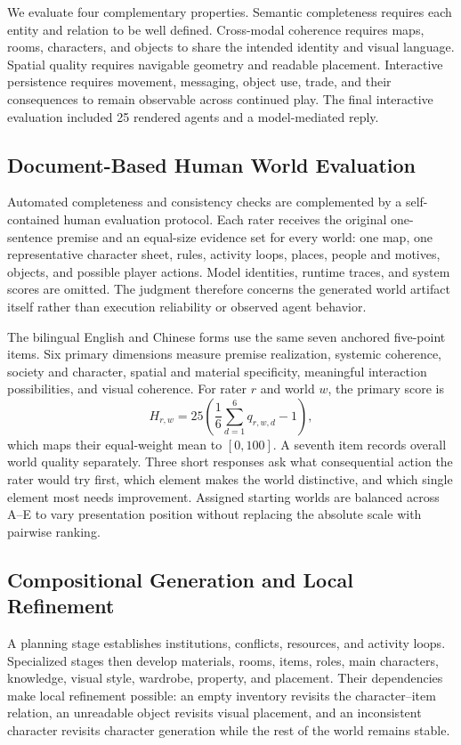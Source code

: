 \documentclass[10pt,twocolumn]{article}
\begin{document}
We evaluate four complementary properties. Semantic completeness requires each
entity and relation to be well defined. Cross-modal coherence requires maps,
rooms, characters, and objects to share the intended identity and visual
language. Spatial quality requires navigable geometry and readable placement.
Interactive persistence requires movement, messaging, object use, trade, and
their consequences to remain observable across continued play. The final
interactive evaluation included 25 rendered agents and a model-mediated reply.

\subsection{Document-Based Human World Evaluation}

Automated completeness and consistency checks are complemented by a
self-contained human evaluation protocol. Each rater receives the original
one-sentence premise and an equal-size evidence set for every world: one map,
one representative character sheet, rules, activity loops, places, people and
motives, objects, and possible player actions. Model identities, runtime traces,
and system scores are omitted. The judgment therefore concerns the generated
world artifact itself rather than execution reliability or observed agent
behavior.

The bilingual English and Chinese forms use the same seven anchored five-point
items. Six primary dimensions measure premise realization, systemic coherence,
society and character, spatial and material specificity, meaningful interaction
possibilities, and visual coherence. For rater $r$ and world $w$, the primary
score is
\[
H_{r,w}=25\left(\frac{1}{6}\sum_{d=1}^{6}q_{r,w,d}-1\right),
\]
which maps their equal-weight mean to $[0,100]$. A seventh item records overall
world quality separately. Three short responses ask what consequential action
the rater would try first, which element makes the world distinctive, and which
single element most needs improvement. Assigned starting worlds are balanced
across A--E to vary presentation position without replacing the absolute scale
with pairwise ranking.

\subsection{Compositional Generation and Local Refinement}

A planning stage establishes institutions, conflicts, resources, and activity
loops. Specialized stages then develop materials, rooms, items, roles, main
characters, knowledge, visual style, wardrobe, property, and placement. Their
dependencies make local refinement possible: an empty inventory revisits the
character--item relation, an unreadable object revisits visual placement, and
an inconsistent character revisits character generation while the rest of the
world remains stable.
\end{document}
